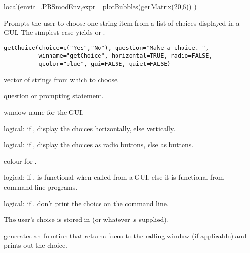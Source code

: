 \documentclass[letterpaper]{book}
\begin{document}
%
\begin{SeeAlso}\relax
{} 
\end{SeeAlso}
%
\begin{Examples}
\begin{ExampleCode}
local(envir=.PBSmodEnv,expr={
  plotBubbles(genMatrix(20,6))
})
\end{ExampleCode}
\end{Examples}
%
\begin{Description}\relax
Prompts the user to choose one string item from a list of 
choices displayed in a GUI. The simplest case  
yields  or .

\end{Description}
%
\begin{Usage}
\begin{verbatim}
getChoice(choice=c("Yes","No"), question="Make a choice: ",
          winname="getChoice", horizontal=TRUE, radio=FALSE,
          qcolor="blue", gui=FALSE, quiet=FALSE)
\end{verbatim}
\end{Usage}
%
\begin{Arguments}
\begin{ldescription}
\item[\code{choice }] vector of strings from which to choose.
\item[\code{question }] question or prompting statement.
\item[\code{winname }] window name for the  GUI.
\item[\code{horizontal }] logical: if , display the choices horizontally, else vertically.
\item[\code{radio }] logical: if , display the choices as radio buttons, else as buttons.
\item[\code{qcolor }] colour for .
\item[\code{gui }] logical: if ,  is functional when called from a GUI,
else it is functional from command line programs.
\item[\code{quiet }] logical: if , don't print the choice on the command line.
\end{ldescription}
\end{Arguments}
%
\begin{Details}\relax
The user's choice is stored in  
(or whatever  is supplied).

 generates an  function that returns focus
to the calling window (if applicable) and prints out the choice.
\end{Details}
\end{document}

